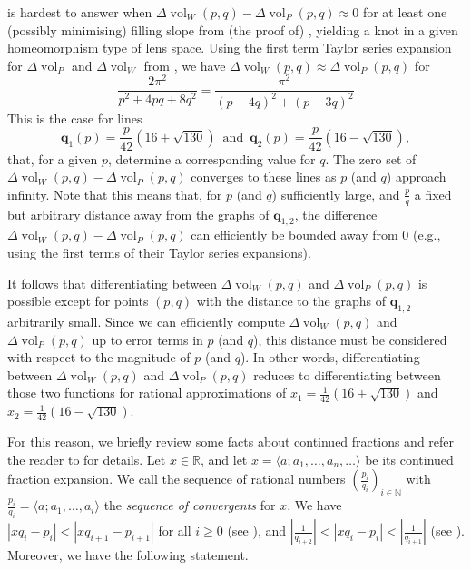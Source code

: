 \documentclass[a4paper]{gtart}
\theoremstyle{definition}
\theoremstyle{remark}
\numberwithin{equation}{section}
\DeclareMathOperator{\vol}{vol}
\begin{document}
 is hardest to answer when 
$\Delta \vol_W (p,q) - \Delta \vol_P (p,q) \approx 0$ for at least one (possibly 
minimising) filling slope from (the proof of) , yielding a 
knot in a given homeomorphism type of lens space. 
Using the first term Taylor series expansion for $\Delta\vol_P$ and $\Delta\vol_W$ 
from , we have 
$\Delta \vol_W (p,q) \approx \Delta \vol_P (p,q)$ for 
\[
\frac{2 \pi^2}{p^2 + 4 p q + 8 q^2} = \frac{\pi^2}{(p - 4 q)^2 + (p - 3 q)^2}
\]
This is the case for lines 
\[ \mathbf{q}_{1} (p) = \frac{p}{42} \left ( 16 + \sqrt{130}\right)\, \text{ and }\, \mathbf{q}_{2} (p) = \frac{p}{42} \left ( 16 - \sqrt{130}\right),\]
that, for a given $p$, determine a corresponding value for $q$.
The zero set of $\Delta \vol_W (p,q) - \Delta \vol_P (p,q)$ converges to these 
lines as $p$ (and $q$) approach infinity. Note that this means that, for $p$ (and $q$) sufficiently 
large, and $\frac{p}{q}$ a fixed but arbitrary distance away from the graphs of 
$\mathbf{q}_{1,2}$, the difference $\Delta \vol_W (p,q) - \Delta \vol_P (p,q)$ can 
efficiently be bounded away from $0$ (e.g., using the first terms of their Taylor 
series expansions).

It follows that differentiating between $\Delta \vol_W (p,q)$ and $\Delta \vol_P (p,q)$
is possible except for points $(p,q)$ with the distance to the graphs of 
$\mathbf{q}_{1,2}$ arbitrarily small. Since we can efficiently compute 
$\Delta \vol_W (p,q)$ and $\Delta \vol_P (p,q)$ up to error terms in $p$ (and $q$), this 
distance must be considered with respect to the magnitude of $p$ (and $q$). In other 
words, differentiating between $\Delta \vol_W (p,q)$ and $\Delta \vol_P (p,q)$ reduces
to differentiating between those two functions for rational approximations of 
$x_1 = \frac{1}{42} \left ( 16 + \sqrt{130}\right)$ and
$x_2 = \frac{1}{42} \left ( 16 - \sqrt{130}\right)$.

For this reason, we briefly review some facts about continued fractions and refer the 
reader to \cite[Chapter 7]{ContinuedFractions} for details. Let $x \in \mathbb{R}$, and 
let $x = \langle a; a_1, \ldots , a_n, \ldots \rangle$ be its continued fraction 
expansion. We call the sequence of rational numbers $(\frac{p_i}{q_i})_{i \in \mathbb{N}}$
with $\frac{p_i}{q_i} = \langle  a; a_1, \ldots , a_i \rangle$ the {\em sequence of 
convergents} for $x$. We have $|xq_i - p_i | < | xq_{i+1} - p_{i+1} |$ for all $i \geq 0$ 
(see \cite[Theorem 7.12]{ContinuedFractions}), and 
$\left|\frac{1}{q_{i+2}} \right| < |xq_i - p_i | < \left|\frac{1}{q_{i+1}}\right|$ (see 
\cite[Theorem 7.11 and the proof of 7.12]{ContinuedFractions}). Moreover, we have the 
following statement.  
\end{document}
